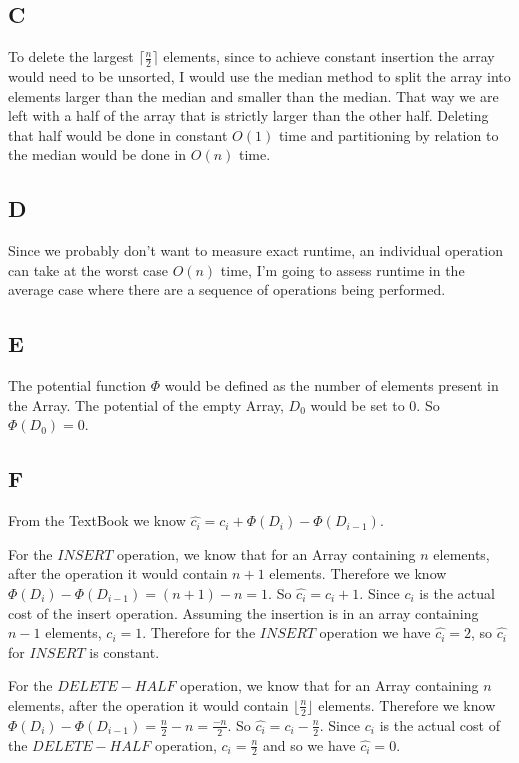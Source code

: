 \documentclass[12pt]{article}
\begin{document}
\subsection{C}

To delete the largest $\lceil \frac{n}{2} \rceil$ elements, since to achieve constant insertion the array would need to be unsorted, I would use the median method to split the array into elements larger than the median and smaller than the median. That way we are left with a half of the array that is strictly larger than the other half. Deleting that half would be done in constant $O(1)$ time and partitioning by relation to the median would be done in $O(n)$ time.

\subsection{D}

Since we probably don't want to measure exact runtime, an individual operation can take at the worst case $O(n)$ time, I'm going to assess runtime in the average case where there are a sequence of operations being performed.

\subsection{E}

The potential function $\Phi$ would be defined as the number of elements present in the Array. The potential of the empty Array, $D_{0}$ would be set to $0$. So $\Phi(D_{0}) = 0$.

\pagebreak

\subsection{F}

From the TextBook we know $\hat{c_{i}} = c_{i} + \Phi(D_{i}) - \Phi(D_{i-1})$.

For the $INSERT$ operation, we know that for an Array containing $n$ elements, after the operation it would contain $n+1$ elements. Therefore we know $\Phi(D_{i}) - \Phi(D_{i-1}) = (n+1) - n = 1$. So $\hat{c_{i}} = c_{i} + 1$. Since $c_{i}$ is the actual cost of the insert operation. Assuming the insertion is in an array containing $n-1$ elements, $c_{i} = 1$. Therefore for the $INSERT$ operation we have $\hat{c_{i}} = 2$, so $\hat{c_{i}}$ for $INSERT$ is constant.

For the $DELETE-HALF$ operation, we know that for an Array containing $n$ elements, after the operation it would contain $\lfloor \frac{n}{2} \rfloor$ elements. Therefore we know $\Phi(D_{i}) - \Phi(D_{i-1}) = \frac{n}{2} - n = \frac{-n}{2}$. So $\hat{c_{i}} = c_{i} - \frac{n}{2}$. Since $c_{i}$ is the actual cost of the $DELETE-HALF$ operation, $c_{i} = \frac{n}{2}$ and so we have $\hat{c_{i}} = 0$.
\end{document}
